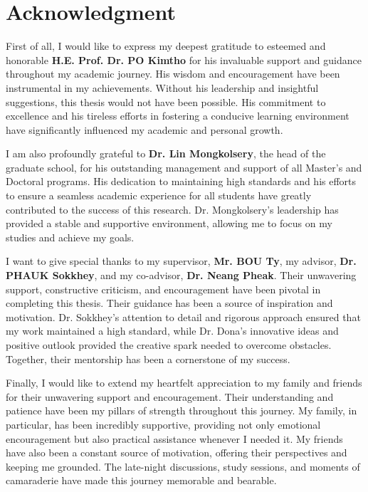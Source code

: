 \chapter*{\centering Acknowledgment}

\hs First of all, I would like to express my deepest gratitude to esteemed and
honorable \textbf{H.E. Prof. Dr. PO Kimtho} for his invaluable support and guidance
throughout my academic journey. His wisdom and encouragement have been
instrumental in my achievements. Without his leadership and insightful suggestions, this thesis would not have been possible. His commitment to excellence and his tireless efforts in fostering a conducive learning environment have significantly influenced my academic and personal growth.

\hs I am also profoundly grateful to \textbf{Dr. Lin Mongkolsery}, the head of the graduate school, for his outstanding management and support of all Master's and Doctoral programs. His dedication to maintaining high standards and his efforts to ensure a seamless academic experience for all students have greatly contributed to the success of this research. Dr. Mongkolsery's leadership has provided a stable and supportive environment, allowing me to focus on my studies and achieve my goals.

\hs I want to give special thanks to my supervisor, \textbf{Mr. BOU Ty}, my advisor, \textbf{Dr. PHAUK Sokkhey}, and my co-advisor, \textbf{Dr. Neang Pheak}. Their unwavering support, constructive criticism, and encouragement have been pivotal in completing this thesis. Their guidance has been a source of inspiration and motivation. Dr. Sokkhey's attention to detail and rigorous approach ensured that my work maintained a high standard, while Dr. Dona's innovative ideas and positive outlook provided the creative spark needed to overcome obstacles. Together, their mentorship has been a cornerstone of my success.

\hs Finally, I would like to extend my heartfelt appreciation to my family and friends
for their unwavering support and encouragement. Their understanding and patience have
been my pillars of strength throughout this journey. My family, in particular, has been incredibly supportive, providing not only emotional encouragement but also practical assistance whenever I needed it. My friends have also been a constant source of motivation, offering their perspectives and keeping me grounded. The late-night discussions, study sessions, and moments of camaraderie have made this journey
memorable and bearable.